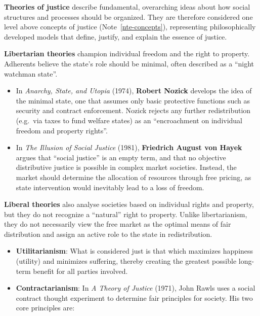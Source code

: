 \documentclass[
  a4paper,
  DIV=11,
  numbers=noendperiod,
  oneside,
  openany]{scrreprt}
\newcounter{quartocalloutnteno}
\newcommand{\quartocalloutnte}[1]{\refstepcounter{quartocalloutnteno}\label{#1}}
\begin{document}
\begin{tcolorbox}[enhanced jigsaw, arc=.35mm, bottomrule=.15mm, bottomtitle=1mm, breakable, colback=white, colbacktitle=quarto-callout-note-color!10!white, colframe=quarto-callout-note-color-frame, coltitle=black, left=2mm, leftrule=.75mm, opacityback=0, opacitybacktitle=0.6, rightrule=.15mm, title={Note \ref*{nte-justice}: Theories of justice}, titlerule=0mm, toprule=.15mm, toptitle=1mm]

\quartocalloutnte{nte-justice} 

\textbf{Theories of justice} describe fundamental, overarching ideas
about how social structures and processes should be organized. They are
therefore considered one level above concepts of justice
(Note~\ref{nte-concepts}), representing philosophically developed models
that define, justify, and explain the essence of justice.

\textbf{Libertarian theories} champion individual freedom and the right
to property. Adherents believe the state's role should be minimal, often
described as a ``night watchman state''.

\begin{itemize}
\item
  In \emph{Anarchy, State, and Utopia} (1974), \textbf{Robert Nozick}
  develops the idea of the minimal state, one that assumes only basic
  protective functions such as security and contract enforcement. Nozick
  rejects any further redistribution (e.g.~via taxes to fund welfare
  states) as an ``encroachment on individual freedom and property
  rights''.
\item
  In \emph{The Illusion of Social Justice} (1981), \textbf{Friedrich
  August von Hayek} argues that ``social justice'' is an empty term, and
  that no objective distributive justice is possible in complex market
  societies. Instead, the market should determine the allocation of
  resources through free pricing, as state intervention would inevitably
  lead to a loss of freedom.
\end{itemize}

\textbf{Liberal theories} also analyse societies based on individual
rights and property, but they do not recognize a ``natural'' right to
property. Unlike libertarianism, they do not necessarily view the free
market as the optimal means of fair distribution and assign an active
role to the state in redistribution.

\begin{itemize}
\item
  \textbf{Utilitarianism}: What is considered just is that which
  maximizes happiness (utility) and minimizes suffering, thereby
  creating the greatest possible long-term benefit for all parties
  involved.
\item
  \textbf{Contractarianism}: In \emph{A Theory of Justice} (1971), John
  Rawls uses a social contract thought experiment to determine fair
  principles for society. His two core principles are:


\end{itemize}
\end{tcolorbox}
\end{document}
